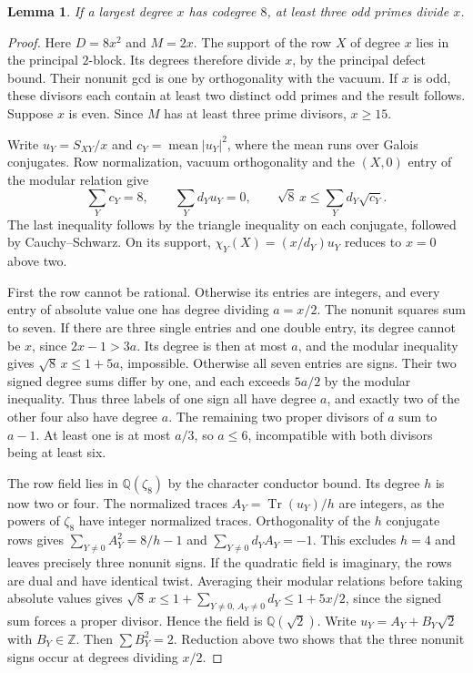 \documentclass[11pt]{amsart}
\numberwithin{equation}{section}
\newtheorem{lemma}[theorem]{Lemma}
\begin{document}
\begin{lemma}\label{lem:eight-support}
If a largest degree $x$ has codegree $8$, at least three odd primes divide $x$.
\end{lemma}
\begin{proof}
Here $D=8x^2$ and $M=2x$. The support of the row $X$ of degree $x$ lies in the principal $2$-block. Its degrees therefore divide $x$, by the principal defect bound. Their nonunit gcd is one by orthogonality with the vacuum. If $x$ is odd, these divisors each contain at least two distinct odd primes and the result follows. Suppose $x$ is even. Since $M$ has at least three prime divisors, $x\ge15$.

Write $u_Y=S_{XY}/x$ and $c_Y=\operatorname{mean}|u_Y|^2$, where the mean runs over Galois conjugates. Row normalization, vacuum orthogonality and the $(X,0)$ entry of the modular relation give
\[
 \sum_Y c_Y=8,\qquad \sum_Y d_Yu_Y=0,\qquad
 \sqrt8\,x\le\sum_Yd_Y\sqrt{c_Y}.
\]
The last inequality follows by the triangle inequality on each conjugate, followed by Cauchy--Schwarz. On its support, $\chi_Y(X)=(x/d_Y)u_Y$ reduces to $x=0$ above two.

First the row cannot be rational. Otherwise its entries are integers, and every entry of absolute value one has degree dividing $a=x/2$. The nonunit squares sum to seven. If there are three single entries and one double entry, its degree cannot be $x$, since $2x-1>3a$. Its degree is then at most $a$, and the modular inequality gives $\sqrt8\,x\le1+5a$, impossible. Otherwise all seven entries are signs. Their two signed degree sums differ by one, and each exceeds $5a/2$ by the modular inequality. Thus three labels of one sign all have degree $a$, and exactly two of the other four also have degree $a$. The remaining two proper divisors of $a$ sum to $a-1$. At least one is at most $a/3$, so $a\le6$, incompatible with both divisors being at least six.

The row field lies in $\mathbb Q(\zeta_8)$ by the character conductor bound. Its degree $h$ is now two or four. The normalized traces $A_Y=\operatorname{Tr}(u_Y)/h$ are integers, as the powers of $\zeta_8$ have integer normalized traces. Orthogonality of the $h$ conjugate rows gives $\sum_{Y\ne0}A_Y^2=8/h-1$ and $\sum_{Y\ne0}d_YA_Y=-1$. This excludes $h=4$ and leaves precisely three nonunit signs. If the quadratic field is imaginary, the rows are dual and have identical twist. Averaging their modular relations before taking absolute values gives $\sqrt8\,x\le1+\sum_{Y\ne0,\,A_Y\ne0}d_Y\le1+5x/2$, since the signed sum forces a proper divisor. Hence the field is $\mathbb Q(\sqrt2)$. Write $u_Y=A_Y+B_Y\sqrt2$ with $B_Y\in\mathbb Z$. Then $\sum B_Y^2=2$. Reduction above two shows that the three nonunit signs occur at degrees dividing $x/2$.


\end{proof}
\end{document}
